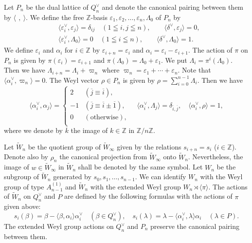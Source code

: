 \documentclass[12pt,twoside]{article}
\newcommand\tW{{\widetilde W}}
\newcommand\av{\alpha^\vee}
\newcommand\eps{\varepsilon}
\newcommand\epsv{\eps^\vee}
\newcommand\deltav{\delta^\vee}
\newcommand\Qv{Q^\vee}
\newcommand\bra{\langle}
\newcommand\ket{\rangle}
\newcommand\Z{{\mathbb Z}} %
\theoremstyle{plain} %
\theoremstyle{definition} %
\theoremstyle{definition} %
\numberwithin{theorem}{section}
\numberwithin{equation}{section}
\numberwithin{figure}{section}
\numberwithin{table}{section}
\begin{document}
Let $P_n$ be the dual lattice of $\Qv_n$ and
denote the canonical pairing between them by $\bra\,\ ,\ \ket$.
We define the free $\Z$-basis $\eps_1,\eps_2,\ldots,\eps_n,\Lambda_0$ 
of $P_n$ by
\begin{align*}
 &
 \bra\epsv_i,\eps_j\ket = \delta_{ij} \quad (1\leqq i,j\leqq n), \qquad
 \bra\deltav,\eps_j\ket = 0,
 \\ &
 \bra\epsv_i,\Lambda_0\ket = 0 \quad (1\leqq i\leqq n), \qquad
 \bra\deltav,\Lambda_0\ket = 1.
\end{align*}
We define $\eps_i$ and $\alpha_i$ for $i\in\Z$ by
$\eps_{i+n} = \eps_i$ and $\alpha_i = \eps_i - \eps_{i+1}$.
The action of $\pi$ on $P_n$ is given by
$\pi(\eps_i) = \eps_{i+1}$ and $\pi(\Lambda_0) = \Lambda_0+\eps_1$.
We put $\Lambda_i=\pi^i(\Lambda_0)$.
Then we have $\Lambda_{i+n} = \Lambda_i + \varpi_n$ 
where $\varpi_n=\eps_1+\cdots+\eps_n$.
Note that $\bra\av_i,\varpi_n\ket = 0$.
The Weyl vector $\rho\in P_n$ is given by $\rho=\sum_{i=0}^{n-1}\Lambda_i$.
Then we have
\begin{equation*}
 \bra\av_i,\alpha_j\ket =
 \begin{cases}
   2 & (\overline{j}\equiv\overline{i}), \\
  -1 & (\overline{j}\equiv\overline{i}\pm\overline{1}), \\
   0 & (\text{otherwise}), \\
 \end{cases}
 \quad
 \bra\av_i,\Lambda_j\ket = \delta_{\overline{i},\overline{j}},
 \quad
 \bra\av_i,\rho\ket = 1,
\end{equation*}
where we denote by $\overline k$ the image of $k\in\Z$ in $\Z/n\Z$.

Let $\tW_n$ be the quotient group of $\tW_\infty$ given by the
relations $s_{i+n}=s_i$ ($i\in\Z$).
Denote also by $\rho_n$ the canonical projection 
from $\tW_\infty$ onto $\tW_n$.
Nevertheless, the image of $w\in\tW_\infty$ in $\tW_n$ 
shall be denoted by the same symbol.
Let $W_n$ be the subgroup of $\tW_n$ generated by $s_0,s_1,\ldots,s_{n-1}$.
We can identify $W_n$ with the Weyl group of type $A^{(1)}_{n-1}$
and $\tW_n$ with the extended Weyl group $W_n\rtimes\bra\pi\ket$.
The actions of $\tW_n$ on $\Qv_n$ and $P$ are defined by 
the following formulas with the actions of $\pi$ given above:
\begin{equation*}
 s_i(\beta) = \beta-\bra\beta,\alpha_i\ket\av_i
 \quad (\beta\in\Qv_n), \quad
 s_i(\lambda) = \lambda-\bra\av_i,\lambda\ket\alpha_i
 \quad (\lambda\in P).
\end{equation*}
The extended Weyl group actions on $\Qv_n$ and $P_n$ preserve
the canonical pairing between them.
\end{document}
